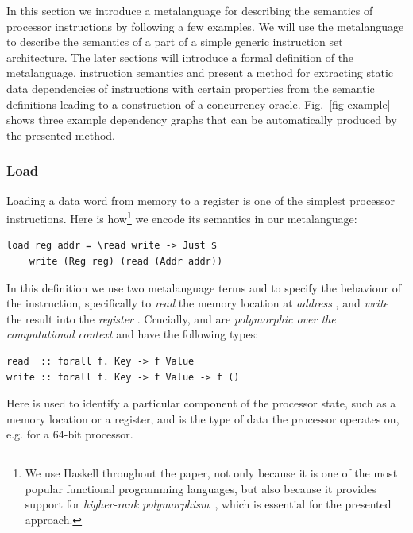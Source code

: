 In this section we introduce a metalanguage for describing the semantics of
processor instructions by following a few examples. We will use the metalanguage
to describe the semantics of a part of a simple generic instruction set
architecture. The later sections will introduce a formal definition of the
metalanguage, instruction semantics and present a method for
extracting static data dependencies of instructions with certain properties from
the semantic definitions leading to a construction of a concurrency oracle.
Fig.~\ref{fig-example} shows three example dependency graphs that can be
automatically produced by the presented method.

\vspace{-2mm}
\subsubsection{Load} Loading a data word from memory to a register is one of the
simplest processor instructions. Here is
how\footnote{We use Haskell throughout the paper, not only because it is one of
the most popular functional programming languages, but also because it provides
support for \emph{higher-rank polymorphism}~\cite{jones2007practical}, which is
essential for the presented approach.} we encode its semantics in our metalanguage:

\vspace{-1mm}
\begin{verbatim}
load reg addr = \read write -> Just $
    write (Reg reg) (read (Addr addr))
\end{verbatim}
\vspace{-1mm}

\noindent
In this definition we use two metalanguage terms  and  to
specify the behaviour of the instruction, specifically to \emph{read} the memory
location at \emph{address} , and \emph{write} the result into the
\emph{register} . Crucially,  and  are
\emph{polymorphic over the computational context}  and have the following
types:

\vspace{-1mm}
\begin{verbatim}
read  :: forall f. Key -> f Value
write :: forall f. Key -> f Value -> f ()
\end{verbatim}
\vspace{-1mm}

\noindent
Here  is used to identify a particular component of the processor state,
such as a memory location or a register, and  is the type of data the
processor operates on, e.g.  for a 64-bit processor.

